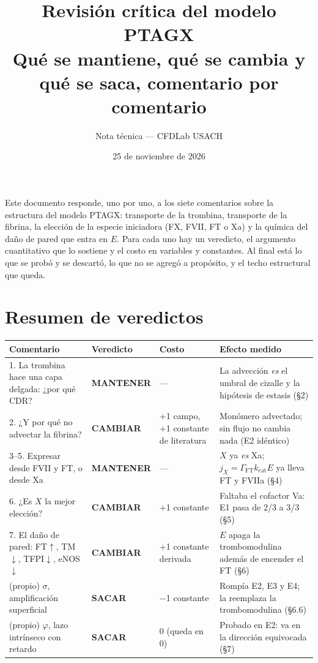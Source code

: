\documentclass[11pt,a4paper]{article}
\title{\vspace{-1.5cm}\textbf{Revisión crítica del modelo PTAGX}\\[2mm]
\large Qué se mantiene, qué se cambia y qué se saca, comentario por comentario}
\author{Nota técnica --- CFDLab USACH}
\date{25 de noviembre de 2026}
\newcommand{\MANT}{\textcolor{keep}{\textbf{MANTENER}}}
\newcommand{\CAMB}{\textcolor{chg}{\textbf{CAMBIAR}}}
\newcommand{\SACA}{\textcolor{out}{\textbf{SACAR}}}
\begin{document}
\maketitle
\thispagestyle{fancy}

\noindent
Este documento responde, uno por uno, a los siete comentarios sobre la estructura del
modelo PTAGX: transporte de la trombina, transporte de la fibrina, la elección de
la especie iniciadora (FX, FVII, FT o Xa) y la química del daño de pared que entra
en $E$. Para cada uno hay un veredicto, el argumento cuantitativo que lo sostiene y
el costo en variables y constantes. Al final está lo que se probó y se descartó, lo
que no se agregó a propósito, y el techo estructural que queda.

\section{Resumen de veredictos}

\renewcommand{\arraystretch}{1.25}
\begin{center}
\small
\begin{tabular}{@{}p{5.0cm}p{2.25cm}p{2.9cm}p{4.5cm}@{}}
\toprule
\textbf{Comentario} & \textbf{Veredicto} & \textbf{Costo} & \textbf{Efecto medido} \\
\midrule
1. La trombina hace una capa delgada: ¿por qué CDR? & \MANT & --- &
La advección \emph{es} el umbral de cizalle y la hipótesis de estasis (§2) \\
2. ¿Y por qué no advectar la fibrina? & \CAMB & +1 campo, +1 constante de literatura &
Monómero advectado; sin flujo no cambia nada (E2 idéntico) \\
3--5. Expresar desde FVII y FT, o desde Xa & \MANT & --- &
$X$ ya \emph{es} Xa; $j_X=\Gamma_{\mathrm{FT}}k_{\mathrm{cat}}E$ ya lleva FT y FVIIa (§4) \\
6. ¿Es $X$ la mejor elección? & \CAMB & +1 constante &
Faltaba el cofactor Va: E1 pasa de 2/3 a 3/3 (§5) \\
7. El daño de pared: FT$\uparrow$, TM$\downarrow$, TFPI$\downarrow$, eNOS$\downarrow$ & \CAMB & +1 constante derivada &
$E$ apaga la trombomodulina además de encender el FT (§6) \\
\addlinespace
(propio) $\sigma$, amplificación superficial & \SACA & $-$1 constante &
Rompía E2, E3 y E4; la reemplaza la trombomodulina (§6.6) \\
(propio) $\varphi$, lazo intrínseco con retardo & \SACA & 0 (queda en 0) &
Probado en E2: va en la dirección equivocada (§7) \\
\bottomrule
\end{tabular}
\end{center}
\end{document}
